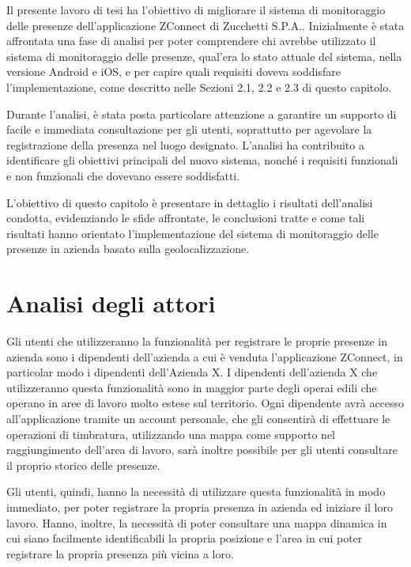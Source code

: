 Il presente lavoro di tesi ha l'obiettivo di migliorare il sistema di monitoraggio delle presenze dell'applicazione ZConnect di Zucchetti S.P.A.. Inizialmente è stata affrontata una fase di analisi per poter comprendere chi avrebbe utilizzato il sistema di monitoraggio delle presenze, qual'era lo stato attuale del sistema, nella versione Android e iOS, e per capire quali requisiti doveva soddisfare l'implementazione, come descritto nelle Sezioni 2.1, 2.2 e 2.3 di questo capitolo.

Durante l'analisi, è stata posta particolare attenzione a garantire un supporto di facile e immediata consultazione per gli utenti, soprattutto per agevolare la registrazione della presenza nel luogo designato. L'analisi ha contribuito a identificare gli obiettivi principali del nuovo sistema, nonché i requisiti funzionali e non funzionali che dovevano essere soddisfatti.

L'obiettivo di questo capitolo è presentare in dettaglio i risultati dell'analisi condotta, evidenziando le sfide affrontate, le conclusioni tratte e come tali risultati hanno orientato l'implementazione del sistema di monitoraggio delle presenze in azienda basato sulla geolocalizzazione.

\section{Analisi degli attori}

Gli utenti che utilizzeranno la funzionalità per registrare le proprie presenze in azienda sono i dipendenti dell'azienda a cui è venduta l'applicazione ZConnect, in particolar modo i dipendenti dell'Azienda X. I dipendenti dell'azienda X che utilizzeranno questa funzionalità sono in maggior parte degli operai edili che operano in aree di lavoro molto estese sul territorio. Ogni dipendente avrà accesso all'applicazione tramite un account personale, che gli consentirà di effettuare le operazioni di timbratura, utilizzando una mappa come supporto nel raggiungimento dell'area di lavoro, sarà inoltre possibile per gli utenti consultare il proprio storico delle presenze.

Gli utenti, quindi, hanno la necessità di utilizzare questa funzionalità in modo immediato, per poter registrare la propria presenza in azienda ed iniziare il loro lavoro. Hanno, inoltre, la necessità di poter consultare una mappa dinamica in cui siano facilmente identificabili la propria posizione e l'area in cui poter registrare la propria presenza più vicina a loro.

